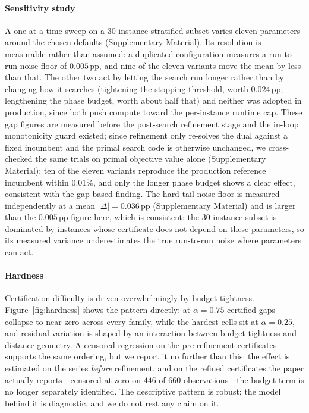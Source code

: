 \documentclass[preprint,12pt]{elsarticle}
\begin{document}
\paragraph{Sensitivity study} A one-at-a-time sweep on a 30-instance stratified subset varies eleven parameters around the chosen defaults (Supplementary Material). Its resolution is measurable rather than assumed: a duplicated configuration measures a run-to-run noise floor of $0.005$\,pp, and nine of the eleven variants move the mean by less than that. The other two act by letting the search run longer rather than by changing how it searches (tightening the stopping threshold, worth $0.024$\,pp; lengthening the phase budget, worth about half that) and neither was adopted in production, since both push compute toward the per-instance runtime cap. These gap figures are measured before the post-search refinement stage and the in-loop monotonicity guard existed; since refinement only re-solves the dual against a fixed incumbent and the primal search code is otherwise unchanged, we cross-checked the same trials on primal objective value alone (Supplementary Material): ten of the eleven variants reproduce the production reference incumbent within $0.01\%$, and only the longer phase budget shows a clear effect, consistent with the gap-based finding. The hard-tail noise floor is measured independently at a mean $|\Delta|=0.036$\,pp (Supplementary Material) and is larger than the $0.005$\,pp figure here, which is consistent: the 30-instance subset is dominated by instances whose certificate does not depend on these parameters, so its measured variance underestimates the true run-to-run noise where parameters can act.

\paragraph{Hardness} Certification difficulty is driven overwhelmingly by budget tightness. Figure~\ref{fig:hardness} shows the pattern directly: at $\alpha=0.75$ certified gaps collapse to near zero across every family, while the hardest cells sit at $\alpha=0.25$, and residual variation is shaped by an interaction between budget tightness and distance geometry. A censored regression on the pre-refinement certificates supports the same ordering, but we report it no further than this: the effect is estimated on the series \emph{before} refinement, and on the refined certificates the paper actually reports---censored at zero on $446$ of $660$ observations---the budget term is no longer separately identified. The descriptive pattern is robust; the model behind it is diagnostic, and we do not rest any claim on it.
\end{document}
